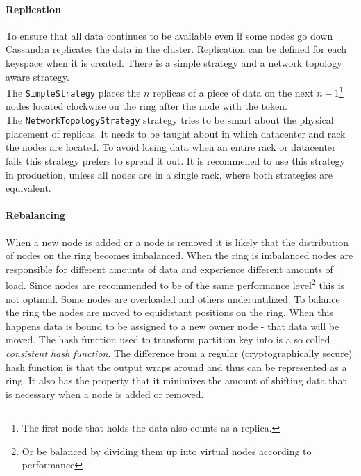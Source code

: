 \paragraph{Replication} To ensure that all data continues to be available even if some nodes go down Cassandra replicates the data in the cluster. Replication can be defined for each keyspace when it is created. There is a simple strategy and a network topology aware strategy. \autocite{datastax_replication} \\
The \texttt{SimpleStrategy} places the $n$ replicas of a piece of data on the next $n-1$\footnote{The first node that holds the data also counts as a replica.} nodes located clockwise on the ring after the node with the token. \autocite[3]{cassandra_paper} \\
The \texttt{NetworkTopologyStrategy} strategy tries to be smart about the physical placement of replicas. It needs to be taught about in which datacenter and rack the nodes are located. To avoid losing data when an entire rack or datacenter fails this strategy prefers to spread it out.
It is recommened to use this strategy in production, unless all nodes are in a single rack, where both strategies are equivalent.

\paragraph{Rebalancing}

When a new node is added or a node is removed it is likely that the distribution of nodes on the ring becomes imbalanced. When the ring is imbalanced nodes are responsible for different amounts of data and experience different amounts of load. Since nodes are recommended to be of the same performance level\footnote{Or be balanced by dividing them up into virtual nodes according to performance} this is not optimal. Some nodes are overloaded and others underuntilized.
To balance the ring the nodes are moved to equidistant positions on the ring. When this happens data is bound to be assigned to a new owner node - that data will be moved. \autocite{datastax_balancing}
The hash function used to transform partition key into is a so colled \textit{consistent hash function}. The difference from a regular (cryptographically secure) hash function is that the output wraps around and thus can be represented as a ring. It also has the property that it minimizes the amount of shifting data that is necessary when a node is added or removed. \autocite{karger1997consistent}

